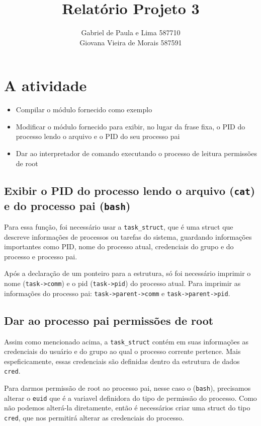 \documentclass[12pt]{article}
\author{Gabriel de Paula e Lima  587710\\
        Giovana Vieira de Morais  587591}
\title{Relatório Projeto 3}
\begin{document}
\maketitle
\newpage

\section*{A atividade}

\begin{itemize}
    \item{Compilar o módulo fornecido como exemplo}
    \item{Modificar o módulo fornecido para exibir, no lugar da frase fixa,
    o PID do processo lendo o arquivo e o PID do seu processo pai}
    \item{Dar ao interpretador de comando executando o processo de leitura
        permissões de root}
\end{itemize}

\subsection*{Exibir o PID do processo lendo o arquivo (\texttt{cat}) e do
processo pai (\texttt{bash})}
    Para essa função, foi necessário usar a \texttt{task\_struct}, que é uma struct que
    descreve informações de processos ou tarefas do sistema, guardando
    informações importantes como PID, nome do processo atual, credenciais do
    grupo e do processo e processo pai.

    Após a declaração de um ponteiro para a estrutura, só foi necessário
    imprimir o nome (\texttt{task->comm}) e o pid (\texttt{task->pid}) do
    processo atual. Para imprimir as informações do processo pai:
    \texttt{task->parent->comm} e \texttt{task->parent->pid}.

\subsection*{Dar ao processo pai permissões de root}
    Assim como mencionado acima, a \texttt{task\_struct} contém em suas
    informações as credenciais do usuário e do grupo ao qual o processo corrente pertence. Mais espeficicamente, essas credenciais são definidas dentro da estrutura de dados \texttt{cred}.

    Para darmos permissão de root ao processo pai, nesse caso o (\texttt{bash}),
    precisamos alterar o \texttt{euid} que é a variavel definidora do
    tipo de permissão do processo. Como não podemos alterá-la diretamente,
    então é necessários criar uma struct do tipo \texttt{cred}, que nos permitirá
    alterar as credenciais do processo. 
    
\end{document}
